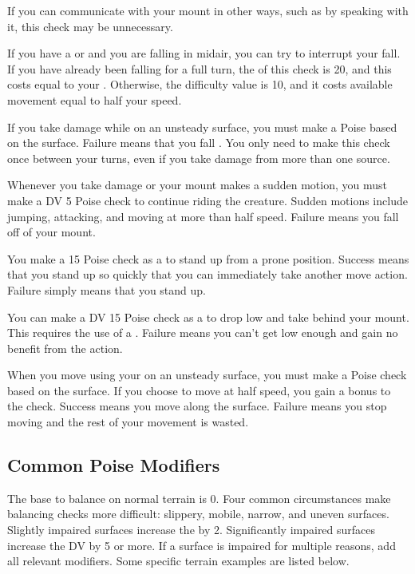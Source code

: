     If you can communicate with your mount in other ways, such as by speaking with it, this check may be unnecessary.

     If you have a  or  and you are falling in midair, you can try to interrupt your fall.
    If you have already been falling for a full turn, the  of this check is 20, and this costs  equal to your .
    Otherwise, the difficulty value is 10, and it costs available movement equal to half your speed.

     If you take damage while on an unsteady surface, you must make a Poise  based on the surface.
    Failure means that you fall \prone.
    You only need to make this check once between your turns, even if you take damage from more than one source.

     Whenever you take damage or your mount makes a sudden motion, you must make a DV 5 Poise check to continue riding the creature.
    Sudden motions include jumping, attacking, and moving at more than half speed.
    Failure means you fall off of your mount.

     You make a  15 Poise check as a  to stand up from a prone position.
    Success means that you stand up so quickly that you can immediately take another move action.
    Failure simply means that you stand up.

     You can make a DV 15 Poise check as a  to drop low and take  behind your mount.
    This requires the use of a .
    Failure means you can't get low enough and gain no benefit from the action.

     When you move using your  on an unsteady surface, you must make a Poise check based on the surface.
    If you choose to move at half speed, you gain a  bonus to the check.
    Success means you move along the surface.
    Failure means you stop moving and the rest of your movement is wasted.

  \subsection{Common Poise Modifiers}
    The base  to balance on normal terrain is 0.
    Four common circumstances make balancing checks more difficult: slippery, mobile, narrow, and uneven surfaces.
    Slightly impaired surfaces increase the  by 2.
    Significantly impaired surfaces increase the DV by 5 or more.
    If a surface is impaired for multiple reasons, add all relevant modifiers.
    Some specific terrain examples are listed below.

